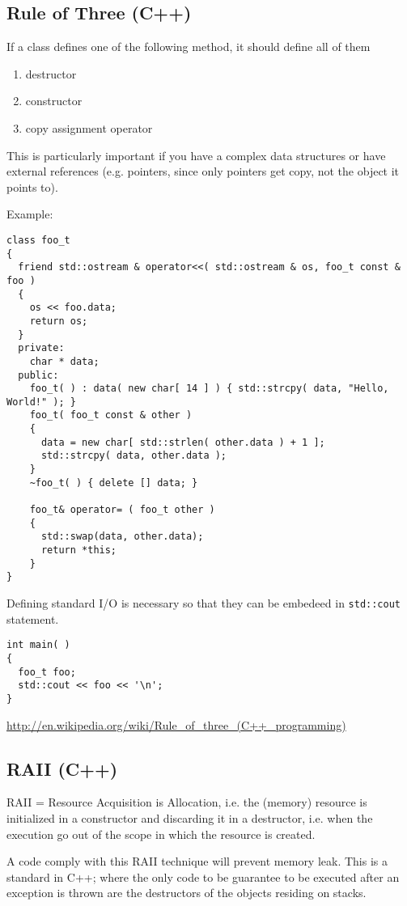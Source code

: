 \subsection{Rule of Three (C++)}

If a class defines one of the following method, it should define all of them
\begin{enumerate}
  \item destructor
  \item constructor
  \item copy assignment operator
\end{enumerate}
This is particularly important if you have a complex data structures or have
external references (e.g. pointers, since only pointers get copy, not the
object it points to).

Example: 
\begin{lstlisting}
class foo_t
{
  friend std::ostream & operator<<( std::ostream & os, foo_t const & foo )
  {
    os << foo.data;
    return os;
  }
  private: 
    char * data;      
  public:
    foo_t( ) : data( new char[ 14 ] ) { std::strcpy( data, "Hello, World!" ); } 
    foo_t( foo_t const & other ) 
    {
      data = new char[ std::strlen( other.data ) + 1 ];
      std::strcpy( data, other.data );
    }
    ~foo_t( ) { delete [] data; }
 
    foo_t& operator= ( foo_t other )
    {
      std::swap(data, other.data);
      return *this;
    }
}
\end{lstlisting}
Defining standard I/O is necessary so that they can be embedeed in
\verb!std::cout! statement.
\begin{lstlisting}
int main( )
{
  foo_t foo;
  std::cout << foo << '\n';
}
\end{lstlisting}


\url{http://en.wikipedia.org/wiki/Rule_of_three_(C++_programming)}

\subsection{RAII (C++)}
\label{sec:RAII}

RAII = Resource Acquisition is Allocation, i.e. the (memory) resource is
initialized in a constructor and discarding it in a destructor, i.e. when the
execution go out of the scope in which the resource is created.

A code comply with this RAII technique will prevent memory leak. This is a
standard in C++; where the only code to be guarantee to be executed after an
exception is thrown are the destructors of the objects residing on stacks.

